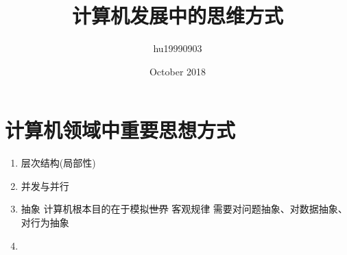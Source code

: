\documentclass{article}
\title{计算机发展中的思维方式}
\author{hu19990903 }
\date{October 2018}
\begin{document}
\maketitle
    \section{计算机领域中重要思想方式}
    \begin{enumerate}
        \item 层次结构(局部性)
        \item 并发与并行
        \item 抽象
        \newline
        计算机根本目的在于模拟\sout{世界} 客观规律 需要对问题抽象、对数据抽象、对行为抽象
        \item 
    \end{enumerate}
\end{document}
